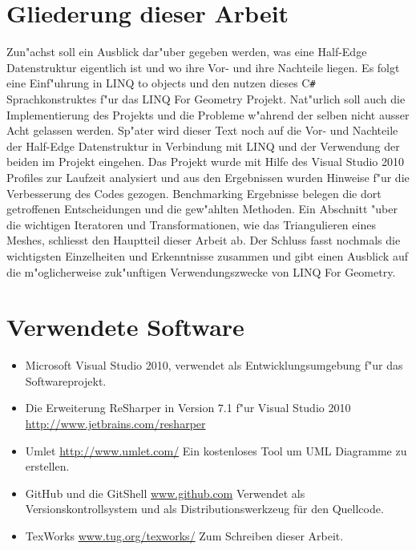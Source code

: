 \documentclass[pagesize, paper=a4, fontsize=12pt,titlepage=true, headings=small, headnosepline, abstractoff, liststotoc, nochapterprefix, plainheadsepline]{scrreprt}
\newcommand{\CSS}{C\texttt{\# }}
\newcommand{\LFG}{LINQ For Geometry}
\newcommand{\LFGS}{LINQ For Geometry }
\newcommand{\HES}{Half-Edge Datenstruktur }
\begin{document}
	\section{Gliederung dieser Arbeit}
	Zun"achst soll ein Ausblick dar"uber gegeben werden, was eine \HES eigentlich ist und wo ihre Vor- und ihre Nachteile liegen. Es folgt eine Einf"uhrung in LINQ to objects und den nutzen dieses \CSS Sprachkonstruktes f"ur das \LFGS Projekt. Nat"urlich soll auch die Implementierung des Projekts und die Probleme w"ahrend der selben nicht ausser Acht gelassen werden. Sp"ater wird dieser Text noch auf die Vor- und Nachteile der \HES in Verbindung mit LINQ und der Verwendung der beiden im Projekt eingehen. Das Projekt wurde mit Hilfe des Visual Studio 2010 Profiles zur Laufzeit analysiert und aus den Ergebnissen wurden Hinweise f"ur die Verbesserung des Codes gezogen. Benchmarking Ergebnisse belegen die dort getroffenen Entscheidungen und die gew"ahlten Methoden. Ein Abschnitt "uber die wichtigen Iteratoren und Transformationen, wie das Triangulieren eines Meshes, schliesst den Hauptteil dieser Arbeit ab. Der Schluss fasst nochmals die wichtigsten Einzelheiten und Erkenntnisse zusammen und gibt einen Ausblick auf die m"oglicherweise zuk"unftigen Verwendungszwecke von \LFG.
	\section {Verwendete Software}
\begin{itemize}
\item Microsoft Visual Studio 2010, \newline verwendet als Entwicklungsumgebung f"ur das Softwareprojekt.
\item Die Erweiterung ReSharper in Version 7.1 f"ur Visual Studio 2010 \url{http://www.jetbrains.com/resharper}
\item Umlet \url{http://www.umlet.com/} \newline Ein kostenloses Tool um UML Diagramme zu erstellen.
\item GitHub und die GitShell \url{www.github.com} \newline Verwendet als Versionskontrollsystem und als Distributionswerkzeug für den Quellcode.
\item TexWorks \url{www.tug.org/texworks/} \newline Zum Schreiben dieser Arbeit.
\end{itemize}
\end{document}
